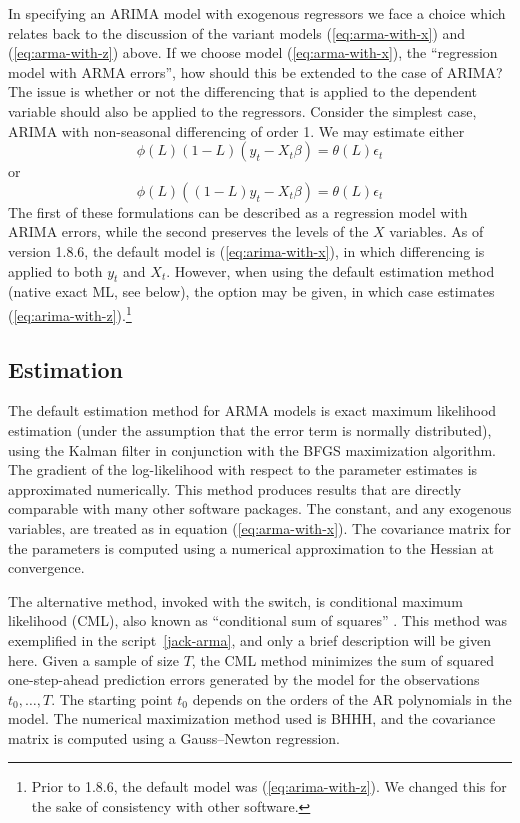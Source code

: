 In specifying an ARIMA model with exogenous regressors we face a
choice which relates back to the discussion of the variant models
(\ref{eq:arma-with-x}) and (\ref{eq:arma-with-z}) above.  If we choose
model (\ref{eq:arma-with-x}), the ``regression model with ARMA
errors'', how should this be extended to the case of ARIMA?  The issue
is whether or not the differencing that is applied to the dependent
variable should also be applied to the regressors.  Consider the
simplest case, ARIMA with non-seasonal differencing of order 1. We may
estimate either
\begin{equation}
  \label{eq:arima-with-x}
  \phi(L) (1-L) (y_t - X_t\beta) = \theta(L) \epsilon_t
\end{equation}
or
\begin{equation}
  \label{eq:arima-with-z}
  \phi(L) \left((1-L) y_t - X_t\beta\right) = \theta(L) \epsilon_t
\end{equation}
%
The first of these formulations can be described as a regression model
with ARIMA errors, while the second preserves the levels of the $X$
variables.  As of  version 1.8.6, the default model is
(\ref{eq:arima-with-x}), in which differencing is applied to both
$y_t$ and $X_t$.  However, when using the default estimation method
(native exact ML, see below), the option  may be
given, in which case  estimates
(\ref{eq:arima-with-z}).\footnote{Prior to  1.8.6, the
  default model was (\ref{eq:arima-with-z}).  We changed this for the
  sake of consistency with other software.}


\subsection{Estimation}
\label{arma-est}

The default estimation method for ARMA models is exact maximum
likelihood estimation (under the assumption that the error term is
normally distributed), using the Kalman filter in conjunction with the
BFGS maximization algorithm.  The gradient of the log-likelihood with
respect to the parameter estimates is approximated numerically.  This
method produces results that are directly comparable with many other
software packages.  The constant, and any exogenous variables, are
treated as in equation (\ref{eq:arma-with-x}).  The covariance matrix
for the parameters is computed using a numerical approximation to the
Hessian at convergence.

The alternative method, invoked with the  switch,
is conditional maximum likelihood (CML), also known as ``conditional
sum of squares'' \citep[see][p.\ 132]{hamilton94}.  This method was
exemplified in the script~\ref{jack-arma}, and only a brief
description will be given here.  Given a sample of size $T$, the CML
method minimizes the sum of squared one-step-ahead prediction errors
generated by the model for the observations $t_0, \ldots, T$.  The
starting point $t_0$ depends on the orders of the AR polynomials in
the model.  The numerical maximization method used is BHHH, and the
covariance matrix is computed using a Gauss--Newton regression.

